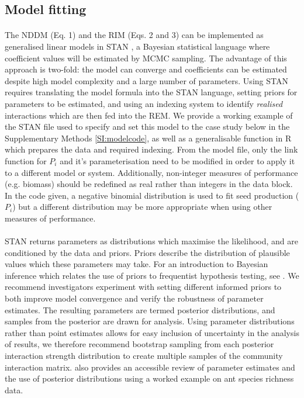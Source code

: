 \documentclass[a4,12pt]{article}
\begin{document}
    \subsection{Model fitting}

        \paragraph{}        
        The NDDM (Eq. 1) and the RIM (Eqs. 2 and 3) can be implemented as generalised linear models in STAN \parencite{Carpenter2017}, a Bayesian statistical language where coefficient values will be estimated by MCMC sampling. The advantage of this approach is two-fold: the model can converge and coefficients can be estimated despite high model complexity and a large number of parameters. Using STAN requires translating the model formula into the STAN language, setting priors for parameters to be estimated, and using an indexing system to identify \textit{realised} interactions which are then fed into the REM. We provide a working example of the STAN file used to specify and set this model to the case study below in the Supplementary Methods \ref{SI:modelcode}, as well as a generalisable function in R which prepares the data and required indexing. From the model file, only the link function for $P_i$ and it's parameterisation need to be modified in order to apply it to a different model or system. Additionally, non-integer measures of performance (e.g. biomass) should be redefined as real rather than integers in the data block. In the code given, a negative binomial distribution is used to fit seed production ($P_i$) but a different distribution may be more appropriate when using other measures of performance.   

        \paragraph{}
        STAN returns parameters as distributions which maximise the likelihood, and are conditioned by the data and priors. Priors describe the distribution of plausible values which these parameters may take. For an introduction to Bayesian inference which relates the use of priors to frequentist hypothesis testing, see \textcite{Ellison1996}. We recommend investigators experiment with setting different informed priors to both improve model convergence and verify the robustness of parameter estimates. The resulting parameters are termed posterior distributions, and samples from the posterior are drawn for analysis. Using parameter distributions rather than point estimates allows for easy inclusion of uncertainty in the analysis of results, we therefore recommend bootstrap sampling from each posterior interaction strength distribution to create multiple samples of the community interaction matrix. \textcite{Ellison2004} also provides an accessible review of parameter estimates and the use of posterior distributions using a worked example on ant species richness data.
\end{document}

